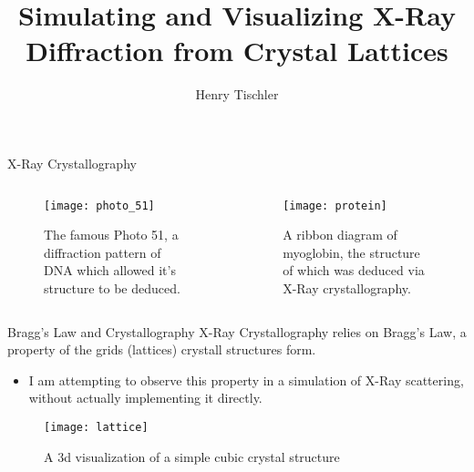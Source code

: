 \documentclass[aspectratio=169]{beamer}
\title {Simulating and Visualizing X-Ray Diffraction from Crystal Lattices}
\author{Henry Tischler}
\institute[Institute of Computing in Research]
\begin{document}
\titlepage

\begin{frame}{X-Ray Crystallography}
\begin{columns}
				
	\begin{column}[b]{.5\textwidth}
		\begin{figure}
			\texttt{[image: photo\_51]}
			\caption{The famous Photo 51, a diffraction pattern of DNA which allowed it's structure to be deduced.}
		\end{figure}
	\end{column}
				
	\begin{column}[b]{.5\textwidth}
		\begin{figure}
			\texttt{[image: protein]}
			\caption{A ribbon diagram of myoglobin, the structure of which was deduced via X-Ray crystallography.}
		\end{figure}
	\end{column}
				
\end{columns}
\end{frame}

\begin{frame}{Bragg's Law and Crystallography}
	X-Ray Crystallography relies on Bragg's Law, a property of the grids (lattices) crystall structures form.
	\begin{itemize}
	\item I am attempting to observe this property in a simulation of X-Ray scattering, without actually implementing it directly.
	\end{itemize}
	
	\begin{figure}
		\texttt{[image: lattice]}
		\caption{A 3d visualization of a simple cubic crystal structure}
	\end{figure}
	
\end{frame}
\end{document}
